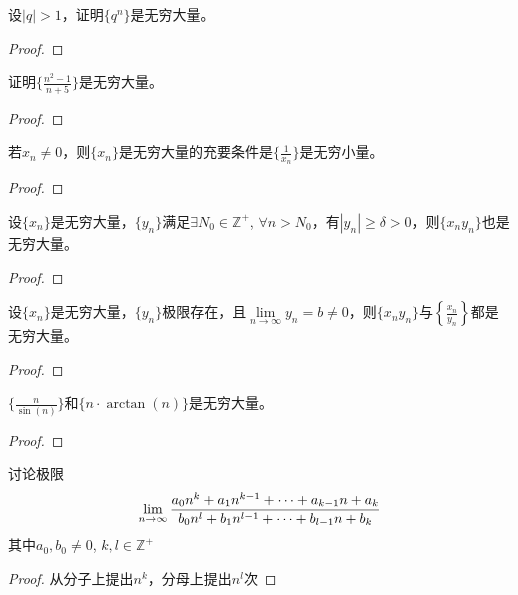 \documentclass[lang=cn]{elegantbook}
\begin{document}
\begin{proposition}
    设$| q | > 1$，证明$\{ q^n \}$是无穷大量。 
\end{proposition}
\begin{proof}
    
\end{proof}

\begin{proposition}
    证明$\{ \frac{n^2-1}{n+5} \}$是无穷大量。 
\end{proposition}
\begin{proof}
    
\end{proof}

\begin{lemma}
    若$x_n \neq 0$，则$\{ x_n \}$是无穷大量的充要条件是$\{ \frac{1}{x_n} \}$是无穷小量。    
\end{lemma}
\begin{proof}

\end{proof}

\begin{lemma}
    设$\{ x_n \}$是无穷大量，$\{ y_n \}$满足$\exists N_0 \in \mathbb{Z}^+$, $\forall n > N_0$，有$| y_n | \ge \delta > 0$，则$\{ x_n y_n\}$也是无穷大量。
\end{lemma}
\begin{proof}
\end{proof}

\begin{lemma}
    设$\{ x_n \}$是无穷大量，$\{ y_n \}$极限存在，且$\lim\limits_{n \to \infty}y_n = b \ne 0$，则$\{ x_n y_n\}$与$\left\{ \frac{x_n}{y_n} \right\}$都是无穷大量。
\end{lemma}
\begin{proof}
\end{proof}

\begin{proposition}
    $\{ \frac{n}{\sin(n)}\}$和$\{ n \cdot \arctan(n)\}$是无穷大量。
\end{proposition}
\begin{proof}
\end{proof}

\begin{proposition}
    讨论极限
    \[ \lim_{n \to \infty} \frac{a_0 n^k + a_1 n^{k - 1} + \cdots + a_{k - 1} n + a_k}{b_0 n^l + b_1 n^{l - 1} + \cdots + b_{l - 1} n + b_k}\]
    其中$a_0, b_0 \ne 0$, $k, l \in \mathbb{Z}^+$
\end{proposition}
\begin{proof}
    从分子上提出$n^k$，分母上提出$n^l$次
\end{proof}
\end{document}
